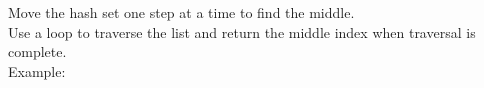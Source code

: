 \documentclass[preview]{standalone}
\begin{document}
Move the hash set one step at a time to find the middle.\\Use a loop to traverse the list and return the middle index when traversal is complete.\\Example:\\
\end{document}
